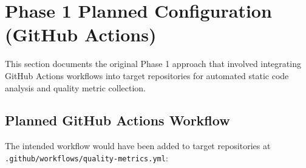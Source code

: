 
\appendix

\section{Phase 1 Planned Configuration (GitHub Actions)}

This section documents the original Phase 1 approach that involved
integrating GitHub Actions workflows into target repositories for
automated static code analysis and quality metric collection.

\subsection{Planned GitHub Actions Workflow}

The intended workflow would have been added to target repositories at
\texttt{.github/workflows/quality-metrics.yml}:


